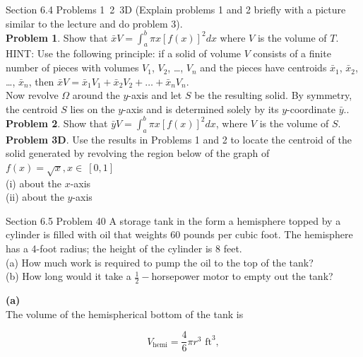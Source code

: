 \documentclass{article}
\begin{document}
    \pagebreak


    \begin{tbhtheorem}{Section 6.4 Problems 1\, 2\, 3D}
        (Explain problems 1 and 2 briefly with a picture similar to the lecture and do problem 3). \\
        \textbf{Problem 1}. Show that $\bar{x}V=\int_a^b \pi x\left[f(x)\right]^2 dx$ where $V$ is the volume of $T$. \\

        HINT: Use the following principle: if a solid of volume $V$ consists of a finite number of pieces with volumes $V_1$, $V_2$, \dots, $V_n$ and the pieces have centroids $\bar{x}_1$, $\bar{x}_2$, \dots, $\bar{x}_n$,
        then $\bar{x}V=\bar{x}_1 V_1 + \bar{x}_2 V_2 + \dots + \bar{x}_n V_n$. \\

        Now revolve $\Omega$ around the $y$-axis and let $S$ be the resulting solid. By symmetry, the centroid $S$ lies on the $y$-axis and is determined solely by its $y$-coordinate $\bar{y}.$. \\

        \textbf{Problem 2}. Show that $\bar{y} V = \int_a^b \pi x\left[f(x)\right]^2 dx$, where $V$ is the volume of $S$. \\
        \textbf{Problem 3D}. Use the results in Problems 1 and 2 to locate the centroid of the solid generated by revolving the region below of the graph of $f(x)=\sqrt{x},x\in\ [0,1]$ \\
        (i) about the $x$-axis \\
        (ii) about the $y$-axis
    \end{tbhtheorem}

    \begin{tbhtheorem}{Section 6.5 Problem 40}
        A storage tank in the form a hemisphere topped by a cylinder is filled with oil that weights 60 pounds per cubic foot. The hemisphere has a 4-foot radius; the height of the cylinder is 8 feet. \\
        (a) How much work is required to pump the oil to the top of the tank? \\
        (b) How long would it take a $\frac{1}{2}-$horsepower motor to empty out the tank?
    \end{tbhtheorem}

    \textbf{(a)} \\
    The volume of the hemispherical bottom of the tank is

    \[
        V_{\text{hemi}} = \frac{4}{6}\pi r^3 \text{ ft}^3,
    \]
\end{document}

